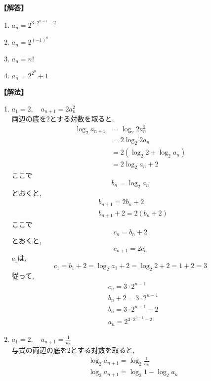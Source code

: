  \noindent\textbf{【解答】}
  \begin{enumerate}[label=(\arabic*),parsep=3pt]
    \item $\displaystyle a_n=2^{3\cdot2^{n-1}-2}$
    \item $a_n=2^{(-1)^{n}}$
    \item $a_n=n!$
    \item $a_n=2^{2^n}+1$
  \end{enumerate}

  \noindent\textbf{【解法】}
  \begin{enumerate}[label=(\arabic*),parsep=3pt]
    \item $\displaystyle a_1=2,\quad a_{n+1}=2a_n^2$\\
          両辺の底を$2$とする対数を取ると,
          \begin{align*}
            \log_2a_{n+1}
              &=\log_2{2a_n^2}\\
              &=2\log_2{2a_n}\\
              &=2(\log_2{2}+\log_2{a_n})\\
              &=2\log_2{a_n}+2
          \end{align*}
          ここで
          \[
            b_n=\log_2a_n
          \]
          とおくと,
          \begin{align*}
            &b_{n+1}=2b_n+2\\
            &b_{n+1}+2=2(b_n+2)
          \end{align*}
          ここで
          \[
            c_n=b_n+2
          \]
          とおくと,
          \[
            c_{n+1}=2c_n
          \]
          $c_1$は,
          \[
            c_1=b_1+2=\log_2{a_1}+2=\log_2{2}+2=1+2=3
          \]
          従って,
          \begin{align*}
            &c_n=3\cdot2^{n-1}\\
            &b_n+2=3\cdot2^{n-1}\\
            &b_n=3\cdot2^{n-1}-2\\
            &a_n=2^{3\cdot2^{n-1}-2}
          \end{align*}
    \item $\displaystyle a_1=2,\quad a_{n+1}=\frac{1}{a_n}$\\
          与式の両辺の底を2とする対数を取ると,
          \begin{align*}
            &\log_2{a_{n+1}}=\log_2{\frac{1}{a_n}}\\
            &\log_2{a_{n+1}}=\log_2{1}-\log_2{a_n}\\

\end{align*}
\end{enumerate}
